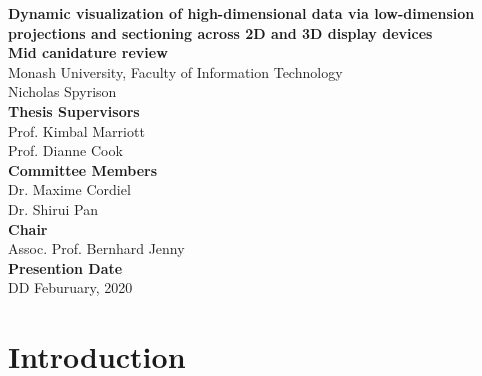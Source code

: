 \documentclass[11,]{article}
\title{}
\author{}
\date{}
\begin{document}

\onehalfspacing
{}

\begin{center}
\LARGE{\textbf{Dynamic visualization of high-dimensional data via
low-dimension projections and sectioning across 2D and 3D display devices}}\\
\vspace*{2\baselineskip}
\Large{\textbf{Mid canidature review}}\\
\normalsize{Monash University, Faculty of Information Technology}\\
\vspace*{2\baselineskip}
\Large{Nicholas Spyrison}\\ %
\vspace*{3\baselineskip}
\Large{\textbf{Thesis Supervisors}}\\
Prof. Kimbal Marriott\\
Prof. Dianne Cook\\
\vspace*{2\baselineskip}
\Large{\textbf{Committee Members}}\\
Dr. Maxime Cordiel\\
Dr. Shirui Pan\\
\vspace*{1\baselineskip}
\Large{\textbf{Chair}}\\
Assoc. Prof. Bernhard Jenny\\
\vspace*{1\baselineskip}
\Large{\textbf{Presention Date}}\\
DD Feburuary, 2020
\end{center}

\doublespacing

\hypersetup{linkcolor = blue}
\newpage
{}
\tableofcontents
{}

\newpage

% 

\doublespacing

\newpage
{}
\hypersetup{linkcolor = blue}

{
\hypersetup{linkcolor=black}
\setcounter{tocdepth}{2}
\tableofcontents
}
\hypertarget{sec:intro}{%
\section{Introduction}\label{sec:intro}}
\end{document}
